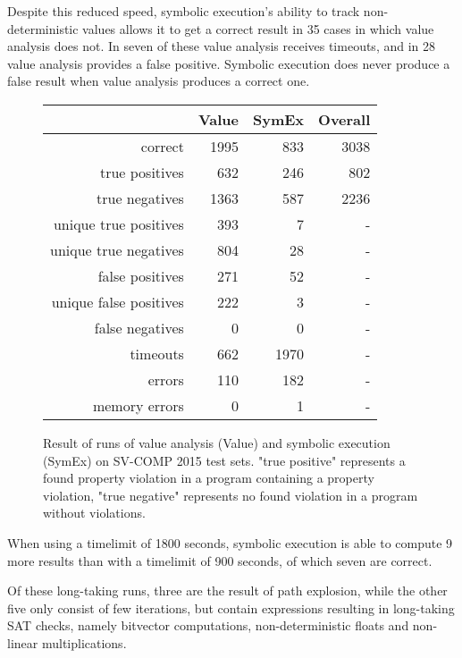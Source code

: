 Despite this reduced speed, symbolic execution's ability to track non-deterministic values allows it to get a correct result in 35 cases in which value analysis does not. In seven of these value analysis receives timeouts, and in 28 value analysis provides a false positive. Symbolic execution does never produce a false result when value analysis produces a correct one.
\begin{figure}
\begin{tabular}{| r || r | r | r |}
\hline
                     & Value & SymEx & Overall \\ \hline
correct                & 1995 &  833 & 3038 \\ \hline
true positives         &  632 &  246 &  802 \\ \hline
true negatives         & 1363 &  587 & 2236 \\ \hline
unique true positives  &  393 &    7 &    - \\ \hline
unique true negatives  &  804 &   28 &    - \\ \hline
false positives        &  271 &   52 &    - \\ \hline
unique false positives &  222 &    3 &    - \\ \hline
false negatives        &    0 &    0 &    - \\ \hline 
timeouts               &  662 & 1970 &    - \\ \hline
errors                 &  110 &  182 &    - \\ \hline
memory errors          &    0 &    1 &    - \\ \hline
\end{tabular}
\label{tab:diff}
\caption{Result of runs of value analysis (Value) and symbolic execution (SymEx) on SV-COMP 2015 test sets.
  "true positive" represents a found property violation in a program containing a property violation,
  "true negative" represents no found violation in a program without violations.}
\end{figure}

When using a timelimit of 1800 seconds, symbolic execution is able to compute 9 more results than with a timelimit of 900 seconds, of which seven are correct.

Of these long-taking runs, three are the result of path explosion,
while the other five only consist of few iterations, but contain expressions resulting in long-taking SAT checks, namely bitvector computations, non-deterministic floats and non-linear multiplications.

